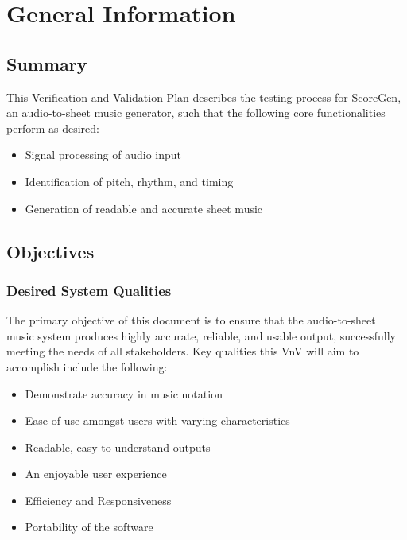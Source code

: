 \documentclass[12pt, titlepage]{article}
\begin{document}
\section{General Information}

\subsection{Summary}

This Verification and Validation Plan describes the testing process for ScoreGen, an 
audio-to-sheet music generator, such that the following core functionalities perform as desired:
\begin{itemize}
  \item Signal processing of audio input
  \item Identification of pitch, rhythm, and timing
  \item Generation of readable and accurate sheet music
\end{itemize}

\subsection{Objectives}

\subsubsection{Desired System Qualities}

The primary objective of this document is to ensure that the audio-to-sheet music system produces 
highly accurate, reliable, and usable output, successfully meeting the needs of all stakeholders. 
Key qualities this VnV will aim to accomplish include the following:
\begin{itemize}
  \item Demonstrate accuracy in music notation
  \item Ease of use amongst users with varying characteristics
  \item Readable, easy to understand outputs
  \item An enjoyable user experience
  \item Efficiency and Responsiveness
  \item Portability of the software
\end{itemize}
\end{document}
